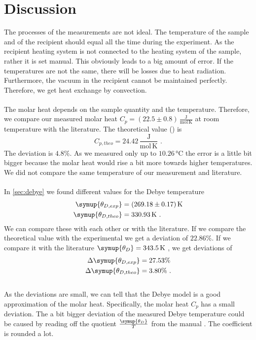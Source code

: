 \section{Discussion}
\label{sec:Diskussion}

The processes of the measurements are not ideal. The temperature of the sample and of the recipient should equal all the time during the experiment. 
As the recipient heating system is not connected to the heating system of the sample, rather it is set manual. This obviously leads to a big 
amount of error. If the temperatures are not the same, there will be losses due to heat radiation.  Furthermore, the vacuum in the recipient 
cannot be maintained perfectly. Therefore, we get heat exchange by convection.\\
\\
The molar heat depends on the sample quantity and the temperature. Therefore, we compare our measured molar heat $C_p = (22.5\pm0.8)\,\mathrm{\frac{J}{mol\, K}}$ at room temperature 
with the literature.
The theoretical value (\cite{Cp}) is  
\begin{equation*}
    C_{p,theo} = 24.42 \,\mathrm{\frac{J}{mol\, K}} \,\, .
\end{equation*}
The deviation is $4.8 \%$. As we measured only up to $10.26 \,\unit{\celsius}$ the error is a little bit bigger because the molar heat would 
rise a bit more towards higher temperatures. We did not compare the same temperature of our measurement and literature. \\
\\
In \autoref{sec:debye} we found different values for the Debye temperature
\begin{align*}
    \symup{\theta_{D,exp}} &= (269.18 \pm  0.17)\,\unit{\kelvin} \\
    \symup{\theta_{D,theo}} &= 330.93\, \unit{\kelvin} \,\, .
\end{align*}
We can compare these with each other or with the literature. If we compare the theoretical value with the experimental we get a deviation  of 
$22.86\%$. 
If we compare it with the literature $\symup{\theta_D} = 343.5\,\unit{\kelvin}$ \cite{theta}, we get deviations of 
\begin{align*}
    \Delta \symup{\theta_{D,exp}} &= 27.53\% \\
    \Delta \symup{\theta_{D,theo}} &= 3.80 \% \,\, .
\end{align*}
\\
As the deviations are small, we can tell that the Debye model is a good approximation of the molar heat. Specifically, the molar heat $C_p$ has a small 
deviation. The a bit bigger deviation of the measured Debye temperature could be caused by reading off the quotient $\frac{\symup{\theta_D}}{T}$ from 
the manual \cite{ap47}. The coefficient is rounded a lot. 